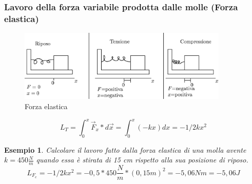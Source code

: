 \documentclass{book}
\newtheorem{esempio}{Esempio}
\begin{document}
\subsubsection{Lavoro della forza variabile prodotta dalle molle (Forza elastica)}
\begin{figure}[th]
    \centering
    \includegraphics[width=10cm]{img/finiti/forza_elastica.eps}
    \caption{Forza elastica}
\end{figure}
\begin{equation}
  L_T=\int^{x}_0 \vec{F}_x*d\vec{x}=\int^x_0(-kx)dx=-1/2kx^2
\end{equation}

\begin{esempio}
  Calcolare il lavoro fatto dalla forza elastica di una molla avente $k=450\frac{N}{m}$ quando
  essa è stirata di 15 cm rispetto alla  sua posizione di riposo.
  \begin{equation}
    L_{F_e}= -1/2 kx^2=-0,5 * 450 \frac{N}{m}*(0,15m)^2=-5,06Nm=-5,06J
  \end{equation}
\end{esempio}
\clearpage
\end{document}
